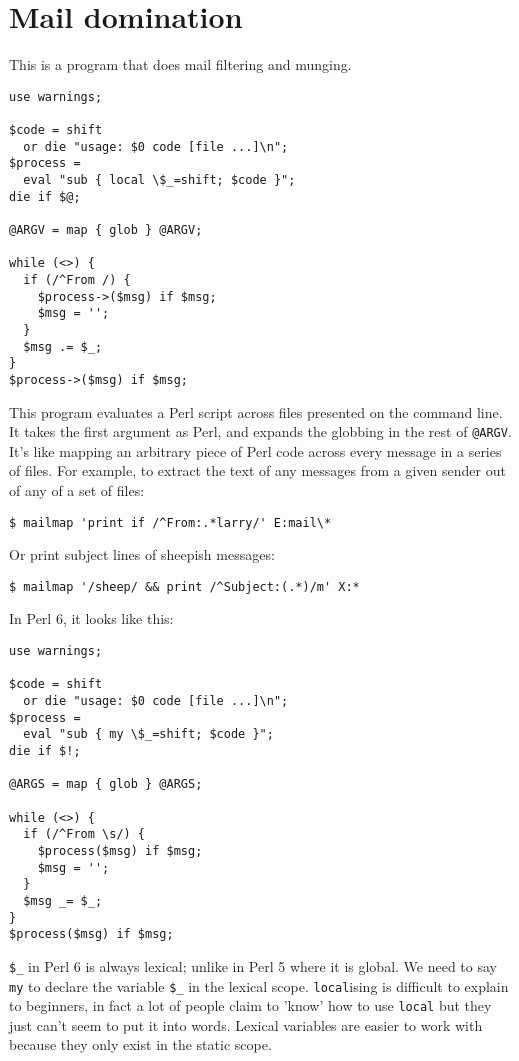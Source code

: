 \documentclass{article}
\newenvironment{example}
  {\addtolength{\linewidth}{-\parindent}%
   \null\begin{minipage}{\linewidth}}
  {\end{minipage}\addtolength{\linewidth}{\parindent}\null}
\begin{document}
\section{Mail domination}
This is a program that does mail filtering and munging.

\begin{example}
\begin{verbatim}
use warnings;

$code = shift
  or die "usage: $0 code [file ...]\n";
$process =
  eval "sub { local \$_=shift; $code }";
die if $@;

@ARGV = map { glob } @ARGV;

while (<>) {
  if (/^From /) {
    $process->($msg) if $msg;
    $msg = '';
  }
  $msg .= $_;
}
$process->($msg) if $msg;

\end{verbatim}
\end{example}

This program evaluates a Perl script across files presented on the
command line.  It takes the first argument as Perl, and expands the 
globbing in the rest of \verb'@ARGV'.
It's like mapping an arbitrary piece of Perl code across every message
in a series of files.  For example, to extract the text of any messages
from a given sender out of any of a set of files:

\verb#$ mailmap 'print if /^From:.*larry/' E:mail\*#

Or print subject lines of sheepish messages:

\verb#$ mailmap '/sheep/ && print /^Subject:(.*)/m' X:*#

\begin{example}
In Perl 6, it looks like this:
\begin{verbatim}
use warnings;

$code = shift
  or die "usage: $0 code [file ...]\n";
$process =
  eval "sub { my \$_=shift; $code }";
die if $!;

@ARGS = map { glob } @ARGS;

while (<>) {
  if (/^From \s/) {
    $process($msg) if $msg;
    $msg = '';
  }
  $msg _= $_;
}
$process($msg) if $msg;

\end{verbatim}
\end{example}

\verb'$_' in Perl 6 is always lexical; unlike in Perl
5 where it is global.  We need to say \verb'my' to declare the variable
\verb'$_' in the lexical scope.  \verb'local'ising is difficult to explain 
to beginners, in fact a lot of people claim to
'know' how to use \verb'local' but they just can't seem to put it into 
words.  Lexical variables are easier
to work with because they only exist in the static scope.
\end{document}
